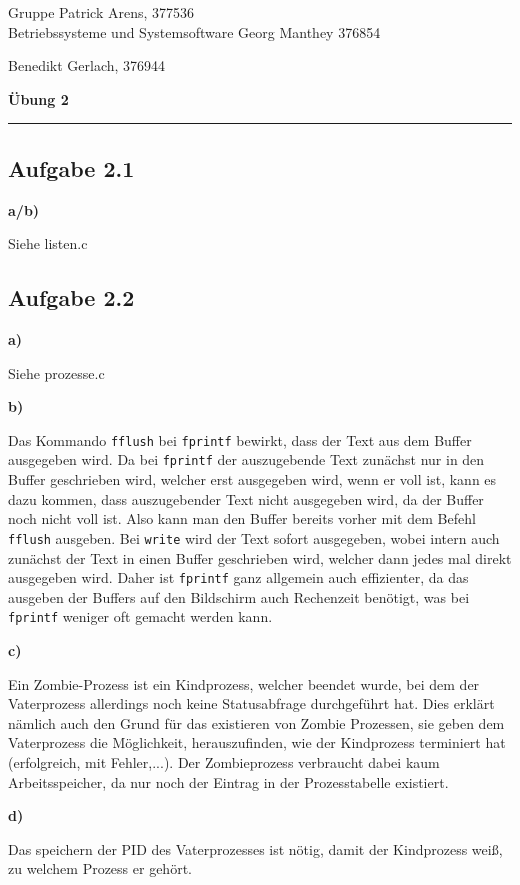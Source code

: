 \documentclass[a4paper,graphics,11pt]{article}
\newcommand{\aufgabe}[1]{\subsection*{Aufgabe #1}}
\begin{document}
    \noindent Gruppe              \hfill Patrick Arens, 377536\\
    \noindent Betriebssysteme und Systemsoftware    \hfill Georg Manthey 376854\\
    \strut\hfill Benedikt Gerlach, 376944\\
    \begin{center}
        \LARGE{\textbf{Übung 2}}
    \end{center}
    \begin{center}
    \rule[0.1ex]{\textwidth}{1pt}
    \end{center}
    
    \aufgabe{2.1}
    
    \textbf{a/b)}
    
    Siehe listen.c

    \aufgabe{2.2}

    \textbf{a)}
    
    Siehe prozesse.c

    \textbf{b)}

    Das Kommando \verb+fflush+ bei \verb+fprintf+ bewirkt, dass der Text aus dem Buffer ausgegeben wird. Da bei \verb+fprintf+ der auszugebende Text zunächst nur in den Buffer geschrieben wird, welcher erst ausgegeben wird, wenn er voll ist, kann es dazu kommen, dass auszugebender Text nicht ausgegeben wird, da der Buffer noch nicht voll ist. Also kann man den Buffer bereits vorher mit dem Befehl \verb+fflush+ ausgeben. Bei \verb+write+ wird der Text sofort ausgegeben, wobei intern auch zunächst der Text in einen Buffer geschrieben wird, welcher dann jedes mal direkt ausgegeben wird. Daher ist \verb+fprintf+ ganz allgemein auch effizienter, da das ausgeben der Buffers auf den Bildschirm auch Rechenzeit benötigt, was bei \verb+fprintf+ weniger oft gemacht werden kann.

    \textbf{c)}

    Ein Zombie-Prozess ist ein Kindprozess, welcher beendet wurde, bei dem der Vaterprozess allerdings noch keine Statusabfrage durchgeführt hat. Dies erklärt nämlich auch den Grund für das existieren von Zombie Prozessen, sie geben dem Vaterprozess die Möglichkeit, herauszufinden, wie der Kindprozess terminiert hat (erfolgreich, mit Fehler,...). Der Zombieprozess verbraucht dabei kaum Arbeitsspeicher, da nur noch der Eintrag in der Prozesstabelle existiert.

    \textbf{d)}
    
    Das speichern der PID des Vaterprozesses ist nötig, damit der Kindprozess weiß, zu welchem Prozess er gehört. 
	
\end{document}

